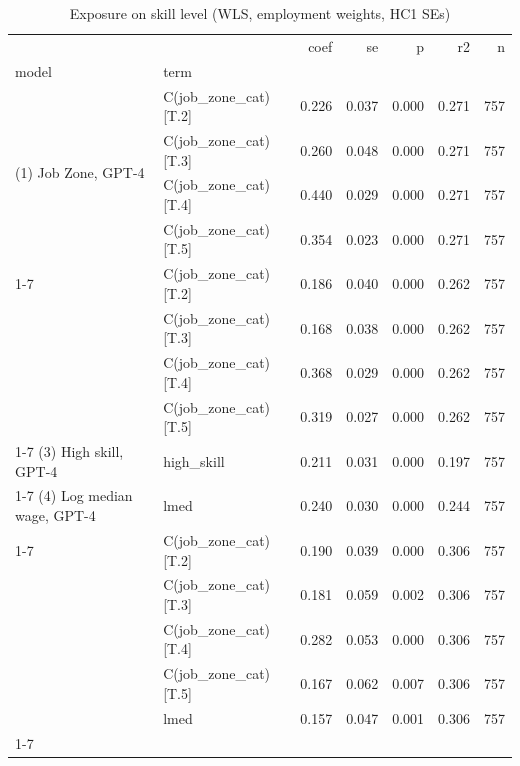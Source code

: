 \begin{table}
\caption{Exposure on skill level (WLS, employment weights, HC1 SEs)}
\label{tab:table2_h1_regressions}
\begin{tabular}{llrrrrr}
\toprule
 &  & coef & se & p & r2 & n \\
model & term &  &  &  &  &  \\
\midrule
\multirow[t]{4}{*}{(1) Job Zone, GPT-4} & C(job\_zone\_cat)[T.2] & 0.226 & 0.037 & 0.000 & 0.271 & 757 \\
 & C(job\_zone\_cat)[T.3] & 0.260 & 0.048 & 0.000 & 0.271 & 757 \\
 & C(job\_zone\_cat)[T.4] & 0.440 & 0.029 & 0.000 & 0.271 & 757 \\
 & C(job\_zone\_cat)[T.5] & 0.354 & 0.023 & 0.000 & 0.271 & 757 \\
\cline{1-7}
\multirow[t]{4}{*}{(2) Job Zone, human} & C(job\_zone\_cat)[T.2] & 0.186 & 0.040 & 0.000 & 0.262 & 757 \\
 & C(job\_zone\_cat)[T.3] & 0.168 & 0.038 & 0.000 & 0.262 & 757 \\
 & C(job\_zone\_cat)[T.4] & 0.368 & 0.029 & 0.000 & 0.262 & 757 \\
 & C(job\_zone\_cat)[T.5] & 0.319 & 0.027 & 0.000 & 0.262 & 757 \\
\cline{1-7}
(3) High skill, GPT-4 & high\_skill & 0.211 & 0.031 & 0.000 & 0.197 & 757 \\
\cline{1-7}
(4) Log median wage, GPT-4 & lmed & 0.240 & 0.030 & 0.000 & 0.244 & 757 \\
\cline{1-7}
\multirow[t]{5}{*}{(5) Log wage + Job Zone} & C(job\_zone\_cat)[T.2] & 0.190 & 0.039 & 0.000 & 0.306 & 757 \\
 & C(job\_zone\_cat)[T.3] & 0.181 & 0.059 & 0.002 & 0.306 & 757 \\
 & C(job\_zone\_cat)[T.4] & 0.282 & 0.053 & 0.000 & 0.306 & 757 \\
 & C(job\_zone\_cat)[T.5] & 0.167 & 0.062 & 0.007 & 0.306 & 757 \\
 & lmed & 0.157 & 0.047 & 0.001 & 0.306 & 757 \\
\cline{1-7}
\bottomrule
\end{tabular}
\end{table}

